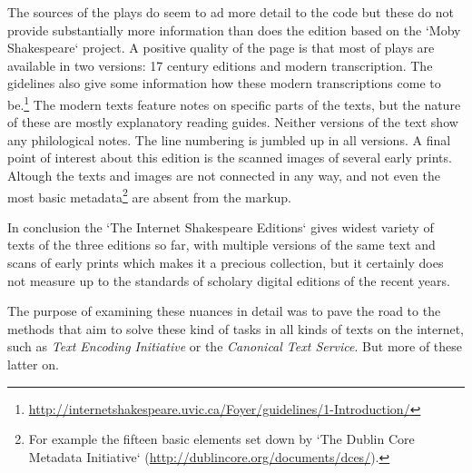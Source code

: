 The sources of the plays do seem to ad more detail to the code but these do not provide substantially more information than does the edition based on the `Moby Shakespeare` project. A positive quality of the page is  that most of plays are available in two versions: 17 century editions and modern transcription. The gidelines also give some information how these modern transcriptions come to be.\footnote{\url{http://internetshakespeare.uvic.ca/Foyer/guidelines/1-Introduction/}} The modern texts feature notes on specific parts of the texts, but the nature of these are mostly explanatory reading guides. Neither versions of the text show any philological notes. The line numbering is jumbled up in all versions.
A final point of interest about this edition is the scanned images of several early prints. Altough the texts and images are not connected in any way, and not even the most basic metadata\footnote{For example the fifteen basic elements set down by `The Dublin Core Metadata Initiative` (\url{http://dublincore.org/documents/dces/}).} are absent from the markup.

In conclusion the `The Internet Shakespeare Editions` gives widest variety of texts of the three editions so far, with multiple versions of the same text and scans of early prints which makes it a precious collection, but it certainly does not measure up to the standards of scholary digital editions of the recent years.



The purpose of examining these nuances in detail was to pave the road to the methods that aim to solve these kind of tasks in all kinds of texts on the internet, such as \textit{Text Encoding Initiative} or the \textit{Canonical Text Service}. But more of these latter on. 